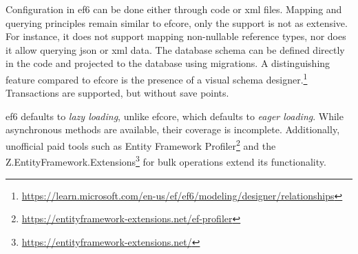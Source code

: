 Configuration in \acrshort{ef}6 can be done either through code or \acrshort{xml} files. Mapping and querying principles remain similar to \acrshort{efcore}, only the support is not as extensive. For instance, it does not support mapping non-nullable reference types, nor does it allow querying \acrshort{json} or \acrshort{xml} data.
The database schema can be defined directly in the code and projected to the database using migrations. A distinguishing feature compared to \acrshort{efcore} is the presence of a visual schema designer.\footnote{\url{https://learn.microsoft.com/en-us/ef/ef6/modeling/designer/relationships}} Transactions are supported, but without save points. 

\acrshort{ef}6 defaults to \textit{lazy loading}, unlike \acrshort{efcore}, which defaults to \textit{eager loading}. While asynchronous methods are available, their coverage is incomplete. Additionally, unofficial paid tools such as Entity Framework Profiler\footnote{\url{https://entityframework-extensions.net/ef-profiler}} and the Z.EntityFramework.Extensions\footnote{\url{https://entityframework-extensions.net/}} for bulk operations extend its functionality.

